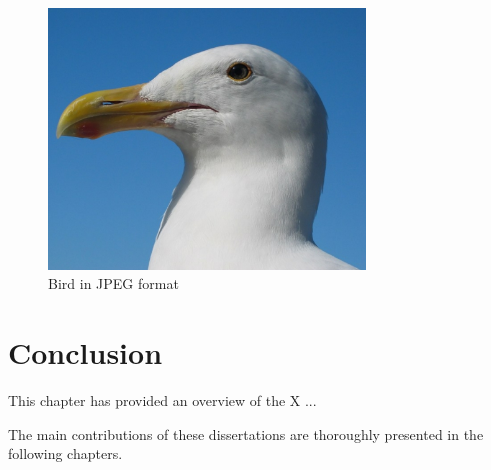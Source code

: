 \begin{figure}[!h]
	\centering
	\includegraphics[width=0.75\textwidth,]{Figures_Chapter_1/bird.pdf}
	\caption{Bird in JPEG format}
	\label{bird_pdf}
\end{figure}

\section{Conclusion}

This chapter has provided an overview of the X ...

The main contributions of these dissertations are thoroughly presented in the following chapters.